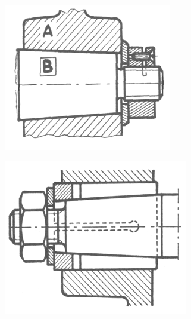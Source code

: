 \documentclass[11pt,oneside]{article}
\begin{document}
\noindent\begin{minipage}[c]{.3\linewidth}
\begin{center}
\includegraphics[width=.9\textwidth]{png/cone_7}
\end{center}
\end{minipage}\hfill
\begin{minipage}[c]{.3\linewidth}
\begin{center}
\includegraphics[width=.9\textwidth]{png/cone_8}
\end{center}
\end{minipage}\hfill
\end{document}
